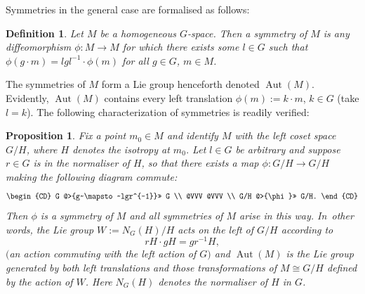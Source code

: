 \documentclass[10pt,a4paper]{amsart}
\numberwithin{equation}{section}
\newtheorem{Proposition}[Theorem]{Proposition}
\newtheorem{Definition}[Theorem]{Definition}
\DeclareMathOperator{\automorphism}{Aut}
\begin{document}
Symmetries in the general case are formalised as follows:
\begin{Definition}\label{symmetriesD}
 Let $M$ be a homogeneous $G$-space. Then a {\it symmetry} of $M$ is
 any diffeomorphism $\phi \colon M \rightarrow M$ for which there
 exists some $l \in G$ such that
 $\phi(g \cdot m) = lgl^{-1} \cdot \phi(m)$ for all
 $g \in G$, $m \in M$.
\end{Definition}

 The symmetries of $M$ form a Lie group henceforth denoted
$\automorphism(M)$. Evidently, $\automorphism(M)$ contains every left
translation $\phi(m):=k \cdot m$, $k \in G$ (take $l=k$). The
following characterization of symmetries is readily verified:

\begin{Proposition}\label{symmetriesP}
 Fix a point $m_0 \in M$ and identify $M$ with the left coset space
 $G/H$, where $H$ denotes the isotropy at $m_0$. Let $l \in G$ be
 arbitrary and suppose $r \in G$ is in the normaliser of $H$, so that
 there exists a map $\phi \colon G/H \rightarrow G/H$ making the
 following diagram commute:
 \begin{equation*}
 \begin{CD} G @>{g~\mapsto~lgr^{-1}}>> G \\ @VVV @VVV \\ G/H
@>{\phi}>> G/H.
 \end{CD}
 \end{equation*}
 Then $\phi $ is a symmetry of $M$ and all
symmetries of $M$ arise in this way. In~other words, the Lie group
$W:=N_G(H)/H$ acts on the left of $G/H$ according to
\[
rH \cdot gH = gr^{-1}H,
\]
$($an action commuting with the left action of $G)$ and
$\automorphism(M)$ is the Lie group generated by both left
translations and those transformations of $M \cong G/H$ defined by the
action of $W$. Here $N_G(H)$ denotes the normaliser of $H $ in $G$.
\end{Proposition}
\end{document}
